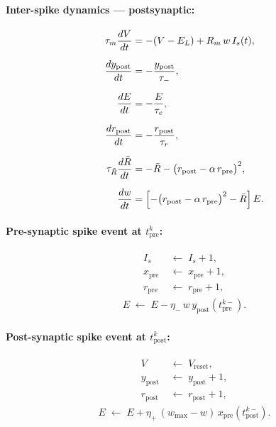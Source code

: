 \documentclass[11pt]{article}
\theoremstyle{plain}
\theoremstyle{definition}
\begin{document}
\paragraph*{Inter-spike dynamics --- postsynaptic:}
\begin{align}
    \tau_m \frac{dV}{dt} &= -(V - E_L) + R_m\, w\, I_s(t), \label{eq:ref_V} \\[6pt]
    \frac{dy_{\mathrm{post}}}{dt} &= -\frac{y_{\mathrm{post}}}{\tau_-}, \label{eq:ref_ypost} \\[6pt]
    \frac{dE}{dt} &= -\frac{E}{\tau_e}, \label{eq:ref_E} \\[6pt]
    \frac{dr_{\mathrm{post}}}{dt} &= -\frac{r_{\mathrm{post}}}{\tau_r}, \label{eq:ref_rpost} \\[6pt]
    \tau_{\bar{R}} \frac{d\bar{R}}{dt} &= -\bar{R} - \bigl(r_{\mathrm{post}} - \alpha\, r_{\mathrm{pre}}\bigr)^2, \label{eq:ref_Rbar} \\[6pt]
    \frac{dw}{dt} &= \Bigl[-\bigl(r_{\mathrm{post}} - \alpha\, r_{\mathrm{pre}}\bigr)^2 - \bar{R}\Bigr]\, E. \label{eq:ref_w}
\end{align}

\paragraph*{Pre-synaptic spike event at $t_{\mathrm{pre}}^k$:}
\begin{align}
    I_s &\;\leftarrow\; I_s + 1, \label{eq:ref_pre_Is} \\[6pt]
    x_{\mathrm{pre}} &\;\leftarrow\; x_{\mathrm{pre}} + 1, \label{eq:ref_pre_xpre} \\[6pt]
    r_{\mathrm{pre}} &\;\leftarrow\; r_{\mathrm{pre}} + 1, \label{eq:ref_pre_rpre}
\end{align}
\begin{align}
    E \;\leftarrow\; E - \eta_-\, w\, y_{\mathrm{post}}(t_{\mathrm{pre}}^{k-}). \label{eq:ref_pre_E}
\end{align}

\paragraph*{Post-synaptic spike event at $t_{\mathrm{post}}^k$:}
\begin{align}
    V &\;\leftarrow\; V_{\mathrm{reset}}, \label{eq:ref_post_V} \\[6pt]
    y_{\mathrm{post}} &\;\leftarrow\; y_{\mathrm{post}} + 1, \label{eq:ref_post_ypost} \\[6pt]
    r_{\mathrm{post}} &\;\leftarrow\; r_{\mathrm{post}} + 1, \label{eq:ref_post_rpost}
\end{align}
\begin{align}
    E \;\leftarrow\; E + \eta_+\,(w_{\mathrm{max}} - w)\, x_{\mathrm{pre}}(t_{\mathrm{post}}^{k-}). \label{eq:ref_post_E}
\end{align}
\end{document}
